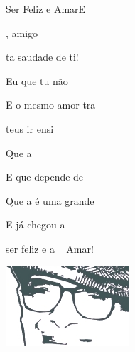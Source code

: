 \documentclass[a4,12pt,oneside]{book}
\begin{document}
\begin{song}{Ser Feliz e Amar}{E}
\begin{SBVerse*}
		, amigo
		
		ta saudade de ti!
		
		Eu  que tu não 
		
		E  o mesmo amor tra
		
		 teus ir ensi 
	\end{SBVerse*}
	
	\begin{SBVerse*}		
		Que a  
		
		E que  depende de 
		
		Que a  é uma grande 
		
		E  já chegou a 

		 ser feliz  e a ~  Amar! 
	\end{SBVerse*}
	
	\ifChordBk
	\vspace{3em}
	
	\begin{center}
		\includegraphics[scale=1.2]{chico.jpg}
	\end{center}
	\fi
\end{song}
\end{document}
